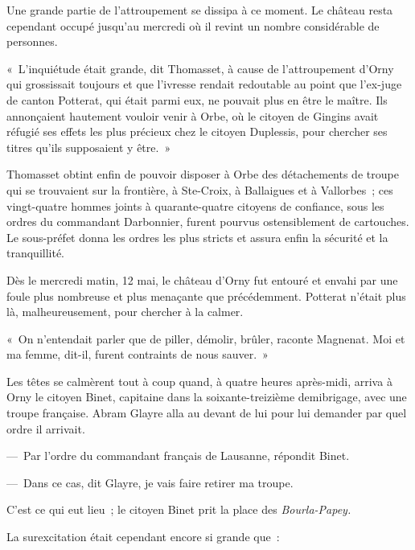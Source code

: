 \documentclass[french,twoside]{book} %
\newenvironment{quoteblock}%
  {\begin{quoting}}
  {\end{quoting}}
\newenvironment{quotebar}{%
    \def\FrameCommand{{\color{rubric!10!}\vrule width 0.5em} \hspace{0.9em}}%
    \def\OuterFrameSep{\itemsep} %
    \MakeFramed {\advance\hsize-\width \FrameRestore}
  }%
  {%
    \endMakeFramed
  }
\renewenvironment{quoteblock}%
  {%
    \savenotes
    \setstretch{0.9}
    \normalfont
    \begin{quotebar}
  }
  {%
    \end{quotebar}
    \spewnotes
  }
\begin{document}
\noindent Une grande partie de l’attroupement se dissipa à ce moment. Le château resta cependant occupé jusqu’au mercredi où il revint un nombre considérable de personnes.\par

\begin{quoteblock}
 \noindent « L’inquiétude était grande, dit Thomasset, à cause de l’attroupement d’Orny qui grossissait toujours et que l’ivresse rendait redoutable au point que l’ex-juge de canton Potterat, qui était parmi eux, ne pouvait plus en être le maître. Ils annonçaient hautement vouloir venir à Orbe, où le citoyen de Gingins avait réfugié ses effets les plus précieux chez le citoyen Duplessis, pour chercher ses titres qu’ils supposaient y être. »
 \end{quoteblock}

\noindent Thomasset obtint enfin de pouvoir disposer à Orbe des détachements de troupe qui se trouvaient sur la frontière, à Ste-Croix, à Ballaigues et à Vallorbes ; ces vingt-quatre hommes joints à quarante-quatre citoyens de confiance, sous les ordres du commandant Darbonnier, furent pourvus ostensiblement de cartouches. Le sous-préfet donna les ordres les plus stricts et assura enfin la sécurité et la tranquillité.\par
Dès le mercredi matin, 12 mai, le château d’Orny fut entouré et envahi par une foule plus nombreuse et plus menaçante que précédemment. Potterat n’était plus là, malheureusement, pour chercher à la calmer.\par

\begin{quoteblock}
\noindent « On n’entendait parler que de piller, démolir, brûler, raconte Magnenat. Moi et ma femme, dit-il, furent contraints de nous sauver. »\end{quoteblock}

\noindent Les têtes se calmèrent tout à coup quand, à quatre heures après-midi, arriva à Orny le citoyen Binet, capitaine dans la soixante-treizième demibrigage, avec une troupe française. Abram Glayre alla au devant de lui pour lui demander par quel ordre il arrivait.\par
— Par l’ordre du commandant français de Lausanne, répondit Binet.\par
— Dans ce cas, dit Glayre, je vais faire retirer ma troupe.\par
C’est ce qui eut lieu ; le citoyen Binet prit la place des \emph{Bourla-Papey.}\par
La surexcitation était cependant encore si grande que :\par
\end{document}
